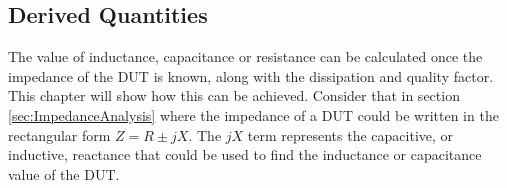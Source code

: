 \subsection{Derived Quantities} \label{subsec:DerivedQuantities}
The value of inductance, capacitance or resistance can be calculated once the impedance of the DUT is known, along with the dissipation and quality factor. This chapter will show how this can be achieved. Consider that in section \ref{sec:ImpedanceAnalysis} where the impedance of a DUT could be written in the rectangular form $Z = R \pm jX$. The $jX$ term represents the capacitive, or inductive, reactance that could be used to find the inductance or capacitance value of the DUT.